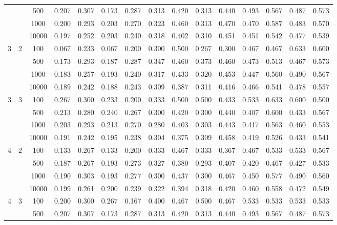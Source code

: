 \documentclass[12pt]{article}
\begin{document}
{\begin{longtable}{ccccccccccccccc}
      &   & 500 & 0.207 & 0.307 & 0.173 & 0.287 & 0.313 & 0.420 & 0.313 & 0.440 & 0.493 & 0.567 & 0.487 & 0.573 \\
      &   & 1000 & 0.200 & 0.293 & 0.203 & 0.270 & 0.323 & 0.460 & 0.313 & 0.470 & 0.470 & 0.587 & 0.483 & 0.570 \\
      &   & 10000 & 0.197 & 0.252 & 0.203 & 0.240 & 0.318 & 0.402 & 0.310 & 0.451 & 0.451 & 0.542 & 0.477 & 0.539 \\
    \hline
    3 & 2 & 100 & 0.067 & 0.233 & 0.067 & 0.200 & 0.300 & 0.500 & 0.267 & 0.300 & 0.467 & 0.467 & 0.633 & 0.600 \\
      &   & 500 & 0.173 & 0.293 & 0.187 & 0.287 & 0.347 & 0.460 & 0.373 & 0.460 & 0.473 & 0.513 & 0.467 & 0.573 \\
      &   & 1000 & 0.183 & 0.257 & 0.193 & 0.240 & 0.317 & 0.433 & 0.320 & 0.453 & 0.447 & 0.560 & 0.490 & 0.567 \\
      &   & 10000 & 0.189 & 0.242 & 0.188 & 0.243 & 0.309 & 0.387 & 0.311 & 0.416 & 0.466 & 0.541 & 0.478 & 0.557 \\
    \hline
    3 & 3 & 100 & 0.267 & 0.300 & 0.233 & 0.200 & 0.333 & 0.500 & 0.500 & 0.433 & 0.533 & 0.633 & 0.600 & 0.500 \\
      &   & 500 & 0.213 & 0.280 & 0.240 & 0.267 & 0.300 & 0.420 & 0.300 & 0.440 & 0.407 & 0.600 & 0.433 & 0.567 \\
      &   & 1000 & 0.203 & 0.293 & 0.213 & 0.270 & 0.280 & 0.403 & 0.303 & 0.443 & 0.417 & 0.563 & 0.460 & 0.553 \\
      &   & 10000 & 0.191 & 0.242 & 0.195 & 0.238 & 0.304 & 0.375 & 0.309 & 0.458 & 0.419 & 0.526 & 0.433 & 0.541 \\
    \hline
    4 & 2 & 100 & 0.133 & 0.267 & 0.133 & 0.200 & 0.333 & 0.467 & 0.333 & 0.367 & 0.467 & 0.533 & 0.533 & 0.567 \\
      &   & 500 & 0.187 & 0.267 & 0.193 & 0.273 & 0.327 & 0.380 & 0.293 & 0.407 & 0.420 & 0.467 & 0.427 & 0.533 \\
      &   & 1000 & 0.190 & 0.303 & 0.193 & 0.277 & 0.300 & 0.437 & 0.300 & 0.467 & 0.450 & 0.577 & 0.490 & 0.560 \\
      &   & 10000 & 0.199 & 0.261 & 0.200 & 0.239 & 0.322 & 0.394 & 0.318 & 0.420 & 0.460 & 0.558 & 0.472 & 0.549 \\
    \hline
    4 & 3 & 100 & 0.200 & 0.300 & 0.267 & 0.167 & 0.400 & 0.467 & 0.500 & 0.467 & 0.533 & 0.533 & 0.533 & 0.533 \\
      &   & 500 & 0.207 & 0.307 & 0.173 & 0.287 & 0.313 & 0.420 & 0.313 & 0.440 & 0.493 & 0.567 & 0.487 & 0.573 \\

\end{longtable}}
\end{document}
